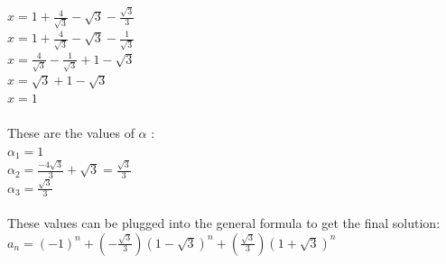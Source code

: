 \documentclass{article}
\begin{document}
\begin{solution}
\\ $x = 1 + \frac{4}{\sqrt{3}}-\sqrt{3}-\frac{\sqrt{3}}{3}$
\\ $x = 1+ \frac{4}{\sqrt{3}} - \sqrt{3} - \frac{1}{\sqrt{3}}$
\\ $x = \frac{4}{\sqrt{3}}-\frac{1}{\sqrt{3}}+1-\sqrt{3}$
\\ $x = \sqrt{3}+1-\sqrt{3}$
\\ $ x = 1$
\newline
\\\\ These are the values of $\alpha$ :
\\ $\alpha_1 = 1$
\\ $ \alpha_2 = \frac{-4\sqrt{3}}{3}+\sqrt{3} = \frac{\sqrt{3}}{3}$
\\ $\alpha_3 = \frac{\sqrt{3}}{3}$
\newline
\\\\ These values can be plugged into the general formula to get the final solution:
\\ $a_n = (-1)^n+(-\frac{\sqrt{3}}{3})(1-\sqrt{3})^n+(\frac{\sqrt{3}}{3})(1+\sqrt{3})^n$




\end{solution}
\end{document}
